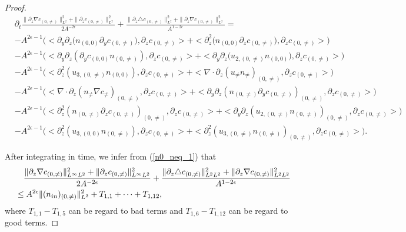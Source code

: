 \documentclass[12pt, reqno]{amsart}
\numberwithin{equation}{section}
\begin{document}
\begin{proof}
		\begin{equation}\label{n0_neq_1}
			\begin{aligned}
				&\partial_t\frac{\|\partial_z\nabla c_{(0,\neq)}\|^2_{L^2}
					+\|\partial_zc_{(0,\neq)}\|^2_{L^2}}{2A^{-2\epsilon}}
				+\frac{\|\partial_z\triangle c_{(0,\neq)}\|^2_{L^2}+
					\|\partial_z\nabla c_{(0,\neq)}\|^2_{L^2}}{A^{1-2\epsilon}}= \\
				&-A^{2\epsilon-1}\big(<\partial_y\partial_z\big(n_{(0,0)}\partial_{y}c_{(0,\neq)}),\partial_zc_{(0,\neq)}>
				+<\partial_z^2\big(n_{(0,0)}\partial_{z}c_{(0,\neq)}\big),\partial_zc_{(0,\neq)}>\big)\\
				&-A^{2\epsilon-1}\big(<\partial_y\partial_z(\partial_{y}c_{(0,0)}n_{(0,\neq)}),\partial_zc_{(0,\neq)}>
				+<\partial_y\partial_z\big(u_{2,(0,\neq)}n_{(0,0)}\big),\partial_zc_{(0,\neq)}>\big)\\	&-A^{2\epsilon-1}\big(<\partial_z^2(u_{3,(0,\neq)}n_{(0,0)}),
				\partial_zc_{(0,\neq)}>
				+<\nabla\cdot\partial_z(u_{\neq}n_{\neq})_{(0,\neq)},
				\partial_zc_{(0,\neq)}>\big)\\
				&-A^{2\epsilon-1}\big(<\nabla\cdot\partial_z(n_{\neq}\nabla c_{\neq})_{(0,\neq)},\partial_zc_{(0,\neq)}>
				+<\partial_y\partial_z(n_{(0,\neq)}
				\partial_{y}c_{(0,\neq)})_{(0,\neq)},
				\partial_zc_{(0,\neq)}>\big)\\
				&-A^{2\epsilon-1}\big(<\partial_z^2(n_{(0,\neq)}
				\partial_{z}c_{(0,\neq)})_{(0,\neq)},\partial_zc_{(0,\neq)}>
				+<\partial_y\partial_z(u_{2,(0,\neq)}n_{(0,\neq)})_{(0,\neq)},
				\partial_zc_{(0,\neq)}>\big)\\
				&-A^{2\epsilon-1}\big(<\partial_z^2(u_{3,(0,0)}n_{(0,\neq)}),
				\partial_zc_{(0,\neq)}>+
				<\partial_z^2(u_{3,(0,\neq)}n_{(0,\neq)})_{(0,\neq)},
				\partial_zc_{(0,\neq)}>\big).
			\end{aligned}
		\end{equation}
		
		After integrating in time, we infer from (\ref{n0_neq_1}) that  
		\begin{equation}\label{n0_neq_2}
			\begin{aligned}
				&\quad\frac{\|\partial_z\nabla c_{(0,\neq)}\|^2_{L^{\infty}L^2}
					+\|\partial_zc_{(0,\neq)}\|^2_{L^{\infty}L^2}}{2A^{-2\epsilon}}
				+\frac{\|\partial_z\triangle c_{(0,\neq)}\|^2_{L^2L^2}+
					\|\partial_z\nabla c_{(0,\neq)}\|^2_{L^{2}L^2}}{A^{1-2\epsilon}}\\
				&\leq A^{2\epsilon}\|(n_{\rm in})_{(0,\neq)}\|^2_{L^2}+T_{1,1}+\cdots+T_{1,12},
			\end{aligned}
		\end{equation}
		where $T_{1,1}-T_{1,5}$ can be regard to bad terms and 
		$T_{1,6}-T_{1,12}$ can be regard to good terms.
		

\end{proof}
\end{document}
